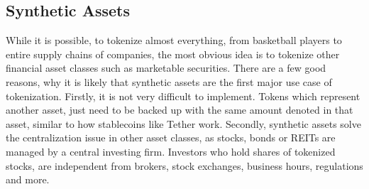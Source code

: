\subsection{Synthetic Assets}
While it is possible, to tokenize almost everything, from basketball players to entire supply chains of companies, the most obvious idea is to tokenize other
financial asset classes such as marketable securities. There are a few good reasons, why it is likely that synthetic assets are the first major use case of
tokenization. Firstly, it is not very difficult to implement. Tokens which represent another asset, just need to be backed up with the same amount denoted in that
asset, similar to how stablecoins like Tether work. Secondly, synthetic assets solve the centralization issue in other asset classes, as stocks, bonds or REITs
are managed by a central investing firm. Investors who hold shares of tokenized stocks, are independent from brokers, stock exchanges, business hours, regulations
and more.
